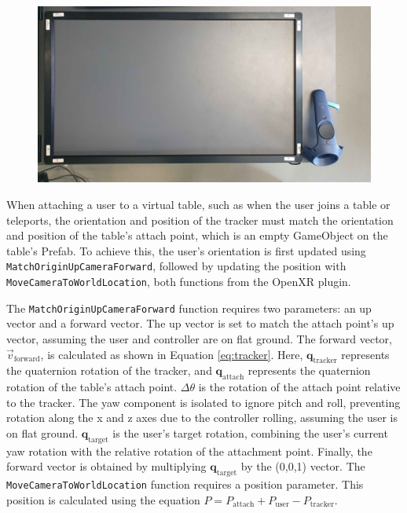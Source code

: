     \begin{figure}[h]
        \centering
        \includegraphics[width=1\textwidth]{figures/table_tracking.jpg}
        \label{fig:table_tracking}
    \end{figure}

    When attaching a user to a virtual table, such as when the user joins a table or teleports, the orientation and position of the tracker must match the orientation and position of the table's attach point, which is an empty GameObject on the table's Prefab. To achieve this, the user's orientation is first updated using \lstinline{MatchOriginUpCameraForward}, followed by updating the position with \lstinline{MoveCameraToWorldLocation}, both functions from the OpenXR plugin. 

    The \lstinline{MatchOriginUpCameraForward} function requires two parameters: an up vector and a forward vector. The up vector is set to match the attach point's up vector, assuming the user and controller are on flat ground. The forward vector, \(\vec{v}_{\mathrm{forward}}\), is calculated as shown in Equation \ref{eq:tracker}. Here, $\mathbf{q}_{\mathrm{tracker}}$ represents the quaternion rotation of the tracker, and $\mathbf{q}_{\mathrm{attach}}$ represents the quaternion rotation of the table's attach point. $\Delta\theta$ is the rotation of the attach point relative to the tracker. The yaw component is isolated to ignore pitch and roll, preventing rotation along the x and z axes due to the controller rolling, assuming the user is on flat ground. $\mathbf{q}_{\mathrm{target}}$ is the user's target rotation, combining the user's current yaw rotation with the relative rotation of the attachment point. Finally, the forward vector is obtained by multiplying $\mathbf{q}_{\mathrm{target}}$ by the (0,0,1) vector. The \lstinline{MoveCameraToWorldLocation} function requires a position parameter. This position is calculated using the equation $P = P_{\mathrm{attach}} + P_{\mathrm{user}} - P_{\mathrm{tracker}}$.

